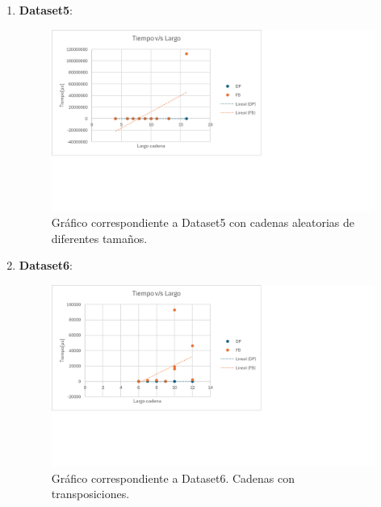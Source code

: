 \begin{enumerate}
    \item \textbf{Dataset5}: 
    \begin{figure}[H]
        \centering
        \includegraphics[width=\textwidth]{tikz/Grafico5.png}
        \caption{Gráfico correspondiente a Dataset5 con cadenas aleatorias de diferentes tamaños.}
        \label{fig:dataset5}
    \end{figure}

    \item \textbf{Dataset6}: 
    \begin{figure}[H]
        \centering
        \includegraphics[width=\textwidth]{tikz/Grafico6.png}
        \caption{Gráfico correspondiente a Dataset6. Cadenas con transposiciones.}
        \label{fig:dataset6}
    \end{figure}
\end{enumerate}
